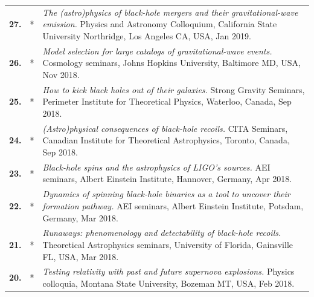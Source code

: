 {\begin{longtable}{rp{0.3cm}p{15.8cm}}
%
\textbf{27.} & * & \textit{The (astro)physics of black-hole mergers and their gravitational-wave emission.}
\newline{}
Physics and Astronomy Colloquium, California State University Northridge, Los Angeles CA, USA, Jan 2019.
\vspace{0.05cm}\\
%
\textbf{26.} & * & \textit{Model selection for large catalogs of gravitational-wave events.}
\newline{}
Cosmology seminars, Johns Hopkins University, Baltimore MD, USA, Nov 2018.
\vspace{0.05cm}\\
%
\textbf{25.} & * & \textit{How to kick black holes out of their galaxies.}
\newline{}
Strong Gravity Seminars, Perimeter Institute for Theoretical Physics, Waterloo, Canada, Sep 2018.
\vspace{0.05cm}\\
%
\textbf{24.} & * & \textit{(Astro)physical consequences of black-hole recoils.}
\newline{}
CITA Seminars, Canadian Institute for Theoretical Astrophysics, Toronto, Canada, Sep 2018.
\vspace{0.05cm}\\
%
\textbf{23.} & * & \textit{Black-hole spins and the astrophysics of LIGO's sources.}
\newline{}
AEI seminars, Albert Einstein Institute, Hannover, Germany, Apr 2018.
\vspace{0.05cm}\\
%
\textbf{22.} & * & \textit{Dynamics of spinning black-hole binaries as a tool to uncover their formation pathway.}
\newline{}
AEI seminars, Albert Einstein Institute, Potsdam, Germany, Mar 2018.
\vspace{0.05cm}\\
%
\textbf{21.} & * & \textit{Runaways: phenomenology and detectability of black-hole recoils.}
\newline{}
Theoretical Astrophysics seminars, University of Florida, Gainsville FL, USA, Mar 2018.
\vspace{0.05cm}\\
%
\textbf{20.} & * & \textit{Testing relativity with past and future supernova explosions.}
\newline{}
Physics colloquia, Montana State University, Bozeman MT, USA, Feb 2018.
\vspace{0.05cm}\\

\end{longtable}}
